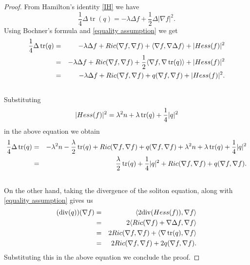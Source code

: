 \documentclass[10pt,a4paper]{amsart}
\begin{document}
\begin{proof}
From Hamilton's identity \eqref{IH} we have 
    $$\frac{1}{4}\Delta \operatorname{tr}(q)=-\lambda\Delta f+\frac{1}{2}\Delta|\nabla f|^2.$$
 Using Bochner's formula and \eqref{equality assumption} we get
 \begin{eqnarray}\label{eq}
\nonumber\frac{1}{4}\Delta \operatorname{tr}(q) &=& -\lambda\Delta f+{\rm Ric}(\nabla f,\nabla f)+\langle\nabla f,\nabla\Delta f\rangle+|{\rm Hess}(f)|^2\\\nonumber
&=& -\lambda\Delta f+{\rm Ric}(\nabla f,\nabla f)+\frac{1}{2}\langle\nabla f,\nabla \operatorname{tr}(q)\rangle+|{\rm Hess}(f)|^2\\
&=& -\lambda\Delta f+{\rm Ric}(\nabla f,\nabla f)+q(\nabla f,\nabla f)+|{\rm Hess}(f)|^2.\\\nonumber
 \end{eqnarray}
Substituting  
$$|{\rm Hess}(f)|^2=\lambda^2n+\lambda \operatorname{tr}(q)+\frac{1}{4}|q|^2$$ in the above equation we obtain 
 \begin{eqnarray}\label{eq03}
\nonumber\frac{1}{4}\Delta \operatorname{tr}(q) &=& -\lambda ^2n-\frac{\lambda}{2}\operatorname{tr}(q)+{\rm Ric}(\nabla f,\nabla f)+q(\nabla f,\nabla f)+\lambda^2n+\lambda \operatorname{tr}(q)+\frac{1}{4}|q|^2\\\nonumber
&=& \frac{\lambda}{2}\operatorname{tr}(q)+\frac{1}{4}|q|^2+{\rm Ric}(\nabla f,\nabla f)+q(\nabla f,\nabla f).\\\nonumber
\end{eqnarray} 
On the other hand, taking the divergence of the soliton equation, along with  \eqref{equality assumption} gives us
\begin{eqnarray}\label{Ric and div}
  \nonumber(\mathrm{div}(q))(\nabla f)  &=& \langle 2\mathrm{div}({\rm Hess}(f)),\nabla f\rangle\\\nonumber
  &=& 2\langle {\rm Ric}(\nabla f)+\nabla\Delta f,\nabla f\rangle \\
  &=& 2{\rm Ric}(\nabla f,\nabla f)+\langle \nabla \operatorname{tr}(q),\nabla f\rangle\\
  &=& 2{\rm Ric}(\nabla f,\nabla f)+2q(\nabla f,\nabla f).\nonumber
\end{eqnarray}
Substituting this in the above equation we conclude the proof.
\end{proof}
\end{document}

